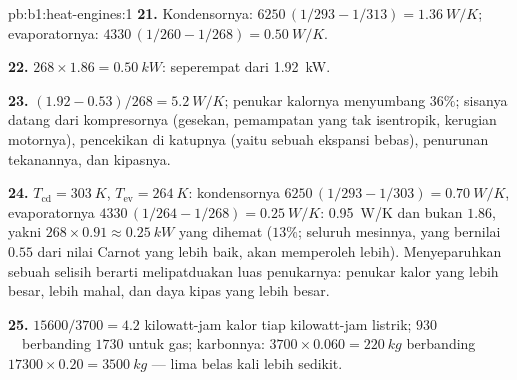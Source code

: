 \begin{solution}{pb:b1:heat-engines:1}
\textbf{21.} Kondensornya: $6250\,(1/293 - 1/313) = \qty{1.36}{W/K}$; evaporatornya:
$4330\,(1/260 - 1/268) = \qty{0.50}{W/K}$.

\textbf{22.} $268 \times 1.86 = \qty{0.50}{kW}$: seperempat dari
\qty{1.92}{kW}.

\textbf{23.} $(1.92 - 0.53)/268 = \qty{5.2}{W/K}$; penukar kalornya menyumbang
$36\%$; sisanya datang dari kompresornya (gesekan, pemampatan yang tak
isentropik, kerugian motornya), pencekikan di katupnya (yaitu sebuah ekspansi
bebas), penurunan tekanannya, dan kipasnya.

\textbf{24.} $T_{\mathrm{cd}} = \qty{303}{K}$, $T_{\mathrm{ev}} = \qty{264}{K}$:
kondensornya $6250\,(1/293 - 1/303) = \qty{0.70}{W/K}$, evaporatornya
$4330\,(1/264 - 1/268) = \qty{0.25}{W/K}$: \qty{0.95}{W/K} dan bukan
$1.86$, yakni $268 \times 0.91 \approx \qty{0.25}{kW}$ yang dihemat ($13\%$;
seluruh mesinnya, yang bernilai $0.55$ dari nilai Carnot yang lebih baik, akan memperoleh
lebih). Menyeparuhkan sebuah selisih berarti melipatduakan luas penukarnya: penukar kalor yang lebih besar,
lebih mahal, dan daya kipas yang lebih besar.

\textbf{25.} $15600/3700 = 4.2$ kilowatt-jam kalor tiap kilowatt-jam
listrik; $930$~\texteuro\ berbanding $1730$ untuk gas; karbonnya: $3700
\times 0.060 = \qty{220}{kg}$ berbanding $17300 \times 0.20 = \qty{3500}{kg}$ ---
lima belas kali lebih sedikit.
\end{solution}
